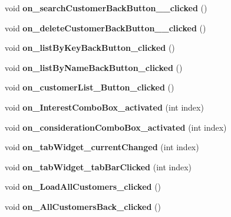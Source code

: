 \begin{DoxyCompactItemize}
void {\bfseries on\+\_\+search\+Customer\+Back\+Button\+\_\+\_\+clicked} ()
\item 
\mbox{\label{class_main_window_a65c4012415c2915c6623cad3b1cec478}} 
void {\bfseries on\+\_\+delete\+Customer\+Back\+Button\+\_\+\_\+clicked} ()
\item 
\mbox{\label{class_main_window_a4174976ca43e7aad31bedaedd0639a9b}} 
void {\bfseries on\+\_\+list\+By\+Key\+Back\+Button\+\_\+clicked} ()
\item 
\mbox{\label{class_main_window_a017555d3eaf72b7ca77522ec661bce93}} 
void {\bfseries on\+\_\+list\+By\+Name\+Back\+Button\+\_\+clicked} ()
\item 
\mbox{\label{class_main_window_ab915ec0529c91b16ba836f8e79172735}} 
void {\bfseries on\+\_\+customer\+List\+\_\+\+Button\+\_\+clicked} ()
\item 
\mbox{\label{class_main_window_a13de2ab1da65213246d73b282e6bce47}} 
void {\bfseries on\+\_\+\+Interest\+Combo\+Box\+\_\+activated} (int index)
\item 
\mbox{\label{class_main_window_abbe03819dea394cf93ea60c266e058d5}} 
void {\bfseries on\+\_\+consideration\+Combo\+Box\+\_\+activated} (int index)
\item 
\mbox{\label{class_main_window_ab5ec4a06e4e38781eb7b913fed92733e}} 
void {\bfseries on\+\_\+tab\+Widget\+\_\+current\+Changed} (int index)
\item 
\mbox{\label{class_main_window_a738c75b6db1208e2378a539403c6aff9}} 
void {\bfseries on\+\_\+tab\+Widget\+\_\+tab\+Bar\+Clicked} (int index)
\item 
\mbox{\label{class_main_window_a6c6d8a61a24b0d33cb871c9e32b100c5}} 
void {\bfseries on\+\_\+\+Load\+All\+Customers\+\_\+clicked} ()
\item 
\mbox{\label{class_main_window_a504c5eacab0a182004f2b6832ef70455}} 
void {\bfseries on\+\_\+\+All\+Customers\+Back\+\_\+clicked} ()
\item 

\end{DoxyCompactItemize}
